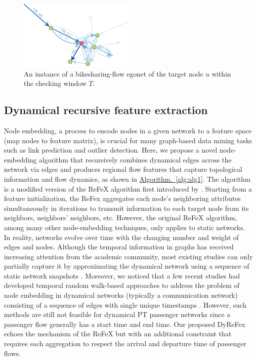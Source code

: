\documentclass[a4paper,fleqn]{cas-sc}
\begin{document}
\begin{figure}[!htb]
  \centering
  \includegraphics[width=0.5\textwidth]{figs/real_ego_net.pdf}
  \caption{An instance of a bikesharing-flow egonet of the target node $u$ within the checking window $T$.}\label{fig:real_ego_net}
\end{figure}

\subsection{Dynamical recursive feature extraction}
Node embedding, a process to encode nodes in a given network to a feature space (map nodes to feature matrix), is crucial for many graph-based data mining tasks such as link prediction and outlier detection. Here, we propose a novel node-embedding algorithm that recursively combines dynamical edges across the network via edges and produces regional flow features that capture topological information and flow dynamics, as shown in \hyperref[alg:alg1]{Algorithm.~\ref{alg:alg1}}. The algorithm is a modified version of the ReFeX algorithm first introduced by \cite{henderson2011s}. Starting from a feature initialization, the ReFex aggregates each node's neighboring attributes simultaneously in iterations to transmit information to each target node from its neighbors, neighbors' neighbors, etc. However, the original ReFeX algorithm, among many other node-embedding techniques, only applies to static networks. In reality, networks evolve over time with the changing number and weight of edges and nodes. Although the temporal information in graphs has received increasing attention from the academic community, most existing studies can only partially capture it by approximating the dynamical network using a sequence of static network snapshots \citep{rossi2012role, rossi2013modeling, saha2018models}. Moreover, we noticed that a few recent studies had developed temporal random walk-based approaches to address the problem of node embedding in dynamical networks (typically a communication network) consisting of a sequence of edges with single unique timestamps \citep{beres2019node,lee2020dynamic}. However, such methods are still not feasible for dynamical PT passenger networks since a passenger flow generally has a start time and end time. Our proposed DyReFex echoes the mechanism of the ReFeX but with an additional constraint that requires each aggregation to respect the arrival and departure time of passenger flows.
\end{document}
